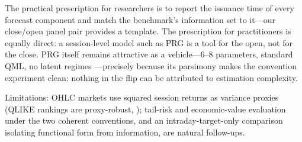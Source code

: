 \documentclass[11pt,a4paper]{article}
\begin{document}
The practical prescription for researchers is to report the issuance time of every forecast component and match the benchmark's information set to it---our close/open panel pair provides a template. The prescription for practitioners is equally direct: a session-level model such as PRG is a tool for the open, not for the close. PRG itself remains attractive as a vehicle---6--8 parameters, standard QML, no latent regimes \citep{Lai2024,Haas2004}---precisely because its parsimony makes the convention experiment clean: nothing in the flip can be attributed to estimation complexity.

Limitations: OHLC markets use squared session returns as variance proxies (QLIKE rankings are proxy-robust, \citealp{Patton2011}); tail-risk and economic-value evaluation under the two coherent conventions, and an intraday-target-only comparison isolating functional form from information, are natural follow-ups.


\end{document}
